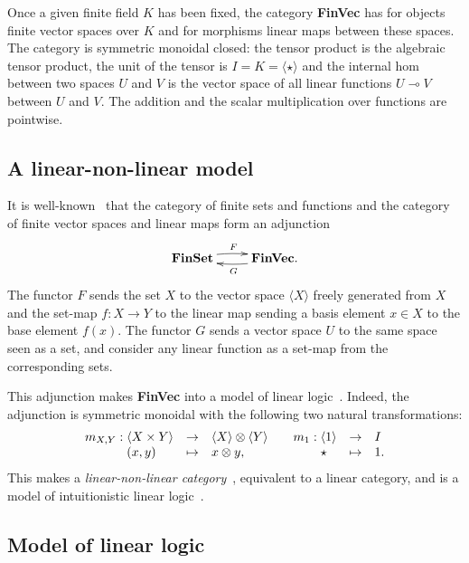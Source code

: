 \documentclass[10pt]{article}
\theoremstyle{plain}
\theoremstyle{definition}
\newcommand{\tensor}{\otimes}
\newcommand{\loli}{\mathbin{\multimap}}
\newcommand{\FinSet}{\mbox{\bf FinSet}}
\newcommand{\FinVec}{\mbox{\bf FinVec}}
\begin{document}
Once a given finite field $K$ has been fixed, 
the category {\FinVec} has for objects finite vector spaces over $K$
and for morphisms linear maps between
these spaces. The category is symmetric monoidal closed: the tensor
product is the algebraic tensor product, the unit of the tensor is
$I=K=\langle\star\rangle$ and the internal hom between
two spaces $U$ and $V$ is the vector space of all linear
functions $U\loli V$ between $U$ and $V$. The addition and the scalar
multiplication over functions are pointwise.


\subsection{A linear-non-linear model}
\label{sec:adjunction}

It is well-known~\cite{maclane} that the category of finite sets and functions and
the category of finite vector spaces and linear maps form an adjunction 
\begin{equation}
\label{eq:adj}
\xymatrix{
  \FinSet\ar@/^1ex/[r]^{F} &\FinVec \ar@/^1ex/[l]^{G}.
}
\end{equation}
The functor $F$ sends the set $X$ to the vector space $\langle X \rangle$ freely generated from
$X$ and the set-map $f:X\to Y$ to the linear map sending a basis
element $x\in X$ to the base element $f(x)$. The functor $G$ sends a
vector space $U$ to the same space seen as a set, and consider any
linear function as a set-map from the corresponding sets.

This adjunction makes {\FinVec}
into a model of linear logic~\cite{pratt92mail}. Indeed, the adjunction is symmetric
monoidal with the following two natural transformations:
\[
\begin{array}{l@{}lll}
m_{X,Y} :{}&\langle X\times Y\rangle &\to& \langle X\rangle\otimes \langle
Y\rangle
\\
&(x,y) &\mapsto& x\tensor y,
\end{array}
\quad
\begin{array}{l@{}lll}
m_{1} : {}&\langle 1\rangle &\to& I
\\
&\star&\mapsto& 1.
\end{array}
\]
This makes a {\em linear-non-linear category}~\cite{benton}, equivalent to a
linear category, and is a model of intuitionistic linear
logic~\cite{bierman}.


\subsection{Model of linear logic}
\end{document}
